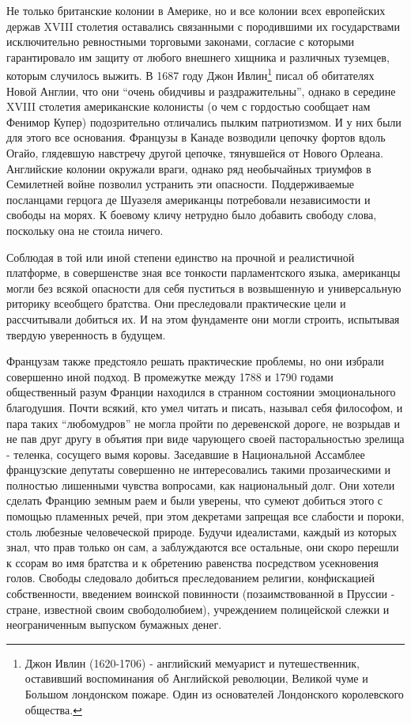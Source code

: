\documentclass[
  oneside,
  12pt,
  titlepage]{book}
\begin{document}
Не только британские колонии в Америке, но и все колонии всех европейских держав XVIII столетия оставались связанными с породившими их государствами исключительно ревностными торговыми законами, согласие с которыми гарантировало им защиту от любого внешнего хищника и различных туземцев, которым случилось выжить. В 1687 году Джон Ивлин\footnote{Джон Ивлин (1620-1706) - английский мемуарист и путешественник, оставивший воспоминания об Английской революции, Великой чуме и Большом лондонском пожаре. Один из основателей Лондонского королевского общества.} писал об обитателях Новой Англии, что они ``очень обидчивы и раздражительны'', однако в середине XVIII столетия американские колонисты (о чем с гордостью сообщает нам Фенимор Купер) подозрительно отличались пылким патриотизмом. И у них были для этого все основания. Французы в Канаде возводили цепочку фортов вдоль Огайо, глядевшую навстречу другой цепочке, тянувшейся от Нового Орлеана. Английские колонии окружали враги, однако ряд необычайных триумфов в Семилетней войне позволил устранить эти опасности. Поддерживаемые посланцами герцога де Шуазеля американцы потребовали независимости и свободы на морях. К боевому кличу нетрудно было добавить свободу слова, поскольку она не стоила ничего.

Соблюдая в той или иной степени единство на прочной и реалистичной платформе, в совершенстве зная все тонкости парламентского языка, американцы могли без всякой опасности для себя пуститься в возвышенную и универсальную риторику всеобщего братства. Они преследовали практические цели и рассчитывали добиться их. И на этом фундаменте они могли строить, испытывая твердую уверенность в будущем.

Французам также предстояло решать практические проблемы, но они избрали совершенно иной подход. В промежутке между 1788 и 1790 годами общественный разум Франции находился в странном состоянии эмоционального благодушия. Почти всякий, кто умел читать и писать, называл себя философом, и пара таких ``любомудров'' не могла пройти по деревенской дороге, не возрыдав и не пав друг другу в объятия при виде чарующего своей пасторальностью зрелища - теленка, сосущего вымя коровы. Заседавшие в Национальной Ассамблее французские депутаты совершенно не интересовались такими прозаическими и полностью лишенными чувства вопросами, как национальный долг. Они хотели сделать Францию земным раем и были уверены, что сумеют добиться этого с помощью пламенных речей, при этом декретами запрещая все слабости и пороки, столь любезные человеческой природе. Будучи идеалистами, каждый из которых знал, что прав только он сам, а заблуждаются все остальные, они скоро перешли к ссорам во имя братства и к обретению равенства посредством усекновения голов. Свободы следовало добиться преследованием религии, конфискацией собственности, введением воинской повинности (позаимствованной в Пруссии - стране, известной своим свободолюбием), учреждением полицейской слежки и неограниченным выпуском бумажных денег.
\end{document}

